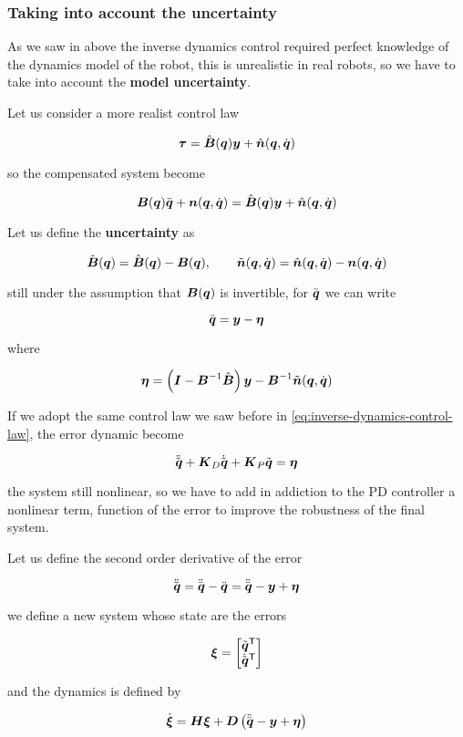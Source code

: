 \subsubsection{Taking into account the uncertainty}

As we saw in above the inverse dynamics control required perfect knowledge of the dynamics model of the robot, this is unrealistic in real robots, so we have to take into account the \textbf{model uncertainty}.

Let us consider a more realist control law

\[
	\vect \tau = \Bs(\q) \vect y + \ns(\q,\dq)
\]

so the compensated system become

\[
	\B(\q)\ddq + \n(\q,\dq) = \Bs(\q) \y + \ns(\q,\dq)
\]

Let us define the \textbf{uncertainty} as

\[
	\Be(\q) = \Bs(\q) - \B(\q), \qquad
	\ner(\q,\dq) = \ns(\q, \dq) - \n(\q, \dq)
\]

still under the assumption that $\B(\q)$ is invertible, for $\ddq$ we can write

\[
	\ddq = \vect y - \vect \eta
\]

where

\[
	\vect\eta = \left( \I - \B^{-1} \Bs  \right)\y - \B^\inv \ner(\q,\dq)
\]

If we adopt the same control law we saw before in \autoref{eq:inverse-dynamics-control-law}, the error dynamic become

\[
	\ddqe + \matr K_D \dqe + \matr K_P \qe = \vect\eta
\]

the system still nonlinear, so we have to add in addiction to the PD controller a nonlinear term, function of the error to improve the robustness of the final system.

Let us define the second order derivative of the error

\[
	\ddqe = \ddqd - \ddq = \ddqd - \y + \vect \eta
\]

we define a new system whose state are the errors

\[
	\vect \xi = \begin{bmatrix} \qe^\trans \\ \dqe^\trans \end{bmatrix}
\]

and the dynamics is defined by

\[
	\dot{\vect\xi} = \matr H \vect\xi + \matr D \left( \ddqd - \y + \vect\eta \right)
\]

